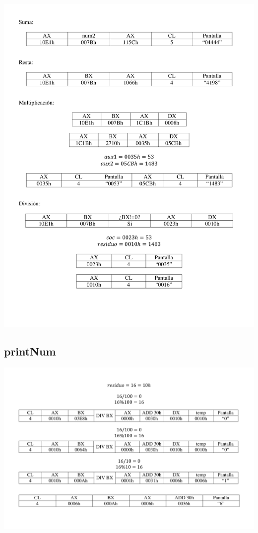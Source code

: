 \documentclass[letter,12 pt,titlepage]{article}
\begin{document}
    \includegraphics[width=1\textwidth]{img/Suma.pdf}

    \subsection{printNum}

    \includegraphics[width=1\textwidth]{img/residuo.pdf}
    
\end{document}
